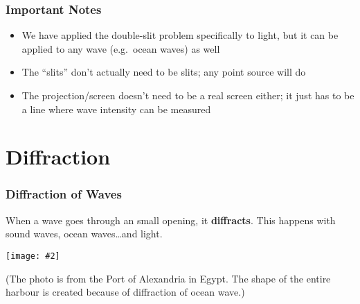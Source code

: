 \documentclass[compress,aspectratio=169]{beamer}
\newcommand{\pic}[2]{\texttt{[image: \#2]}}
\newcommand{\eq}[2]{\vspace{#1}{\LARGE\begin{displaymath}#2\end{displaymath}}}
\begin{document}
%  
%  
%


\begin{frame}
  \frametitle{Important Notes}
  \begin{itemize}
  \item We have applied the double-slit problem specifically to light, but it
    can be applied to any wave (e.g.\ ocean waves) as well
  \item The ``slits'' don't actually need to be slits; any point source will do
  \item The projection/screen doesn't need to be a real screen either; it just
    has to be a line where wave intensity can be measured
  \end{itemize}
\end{frame}

\section{Diffraction}

\begin{frame}
  \frametitle{Diffraction of Waves}
  When a wave goes through an small opening, it \textbf{diffracts}. This happens
  with sound waves, ocean waves\ldots and light.
  \begin{center}
    \pic{.6}{alexandria.jpg}
  \end{center}
  (The photo is from the Port of Alexandria in Egypt. The shape of the entire
  harbour is created because of diffraction of ocean wave.)
\end{frame}
\end{document}
